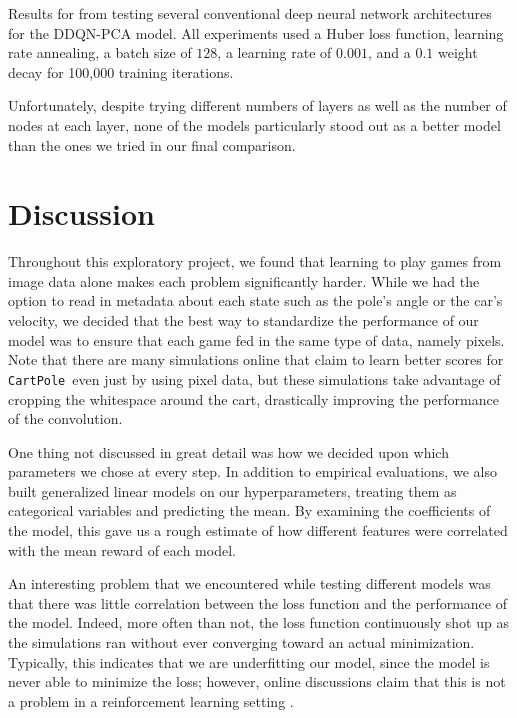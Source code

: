 \documentclass[11pt]{article}
\newcommand{\cp}{\texttt{CartPole}}
\begin{document}
\begin{table}[!ht]
    \footnotesize
    \centering
    
    
    \caption{Results for from testing several conventional deep neural network architectures for the DDQN-PCA model. All experiments used a Huber loss function, learning rate annealing, a batch size of $128$, a learning rate of $0.001$, and a $0.1$ weight decay for 100,000 training iterations.}
    \label{tab:model_selection_ddqn_pca_4}
\end{table}

Unfortunately, despite trying different numbers of layers as well as the number of nodes at each layer, none of the models particularly stood out as a better model than the ones we tried in our final comparison.

\section{Discussion}

Throughout this exploratory project, we found that learning to play games from image data alone makes each problem significantly harder. While we had the option to read in metadata about each state such as the pole's angle or the car's velocity, we decided that the best way to standardize the performance of our model was to ensure that each game fed in the same type of data, namely pixels. Note that there are many simulations online that claim to learn better scores for \cp~even just by using pixel data, but these simulations take advantage of cropping the whitespace around the cart, drastically improving the performance of the convolution.

One thing not discussed in great detail was how we decided upon which parameters we chose at every step. In addition to empirical evaluations, we also built generalized linear models on our hyperparameters, treating them as categorical variables and predicting the mean. By examining the coefficients of the model, this gave us a rough estimate of how different features were correlated with the mean reward of each model.

An interesting problem that we encountered while testing different models was that there was little correlation between the loss function and the performance of the model. Indeed, more often than not, the loss function continuously shot up as the simulations ran without ever converging toward an actual minimization. Typically, this indicates that we are underfitting our model, since the model is never able to minimize the loss; however, online discussions claim that this is not a problem in a reinforcement learning setting \cite{stackexchange2017loss}.
\end{document}
